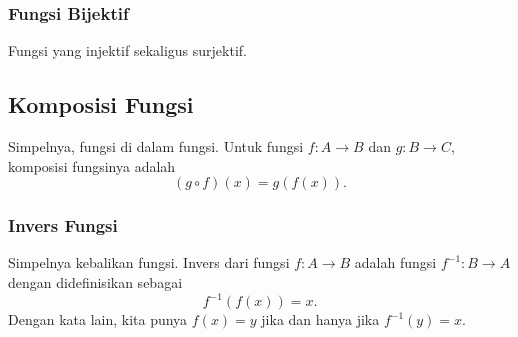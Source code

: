 \subsubsection{Fungsi Bijektif}
Fungsi yang injektif sekaligus surjektif.

\subsection{Komposisi Fungsi}
Simpelnya, fungsi di dalam fungsi. Untuk fungsi $f:A \rightarrow B$ dan $g:B \rightarrow C$, komposisi fungsinya adalah
$$(g \circ f)(x) = g(f(x)).$$

\subsubsection{Invers Fungsi}
Simpelnya kebalikan fungsi. Invers dari fungsi $f: A \rightarrow B$ adalah fungsi $f^{-1} : B \rightarrow A$ dengan didefinisikan sebagai
$$f^{-1}(f(x))=x.$$
Dengan kata lain, kita punya $f(x)=y$ jika dan hanya jika $f^{-1}(y)=x$.
